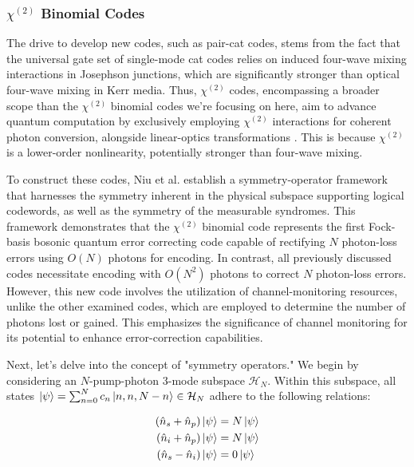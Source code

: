 \documentclass[11pt]{article}
\newcommand\0{\mathbf{0}}
\newcommand\<{\langle}
\renewcommand\>{\rangle}
\begin{document}
\subsubsection{$\chi^{(2)}$ Binomial Codes}
\label{sec:multi-binom}

The drive to develop new codes, such as pair-cat codes, stems from the fact that the universal gate set of single-mode cat codes relies on induced four-wave mixing interactions in Josephson junctions, which are significantly stronger than optical four-wave mixing in Kerr media. Thus, $\chi^{(2)}$ codes, encompassing a broader scope than the $\chi^{(2)}$ binomial codes we're focusing on here, aim to advance quantum computation by exclusively employing $\chi^{(2)}$ interactions for coherent photon conversion, alongside linear-optics transformations \cite{niu2018hardware}. This is because $\chi^{(2)}$ is a lower-order nonlinearity, potentially stronger than four-wave mixing.

To construct these codes, Niu et al. establish a symmetry-operator framework that harnesses the symmetry inherent in the physical subspace supporting logical codewords, as well as the symmetry of the measurable syndromes. This framework demonstrates that the $\chi^{(2)}$ binomial code represents the first Fock-basis bosonic quantum error correcting code capable of rectifying $N$ photon-loss errors using $O(N)$ photons for encoding. In contrast, all previously discussed codes necessitate encoding with $O(N^2)$ photons to correct $N$ photon-loss errors. However, this new code involves the utilization of channel-monitoring resources, unlike the other examined codes, which are employed to determine the number of photons lost or gained. This emphasizes the significance of channel monitoring for its potential to enhance error-correction capabilities.

Next, let's delve into the concept of "symmetry operators." We begin by considering an $N$-pump-photon 3-mode subspace $\mathcal{H}_N$. Within this subspace, all states $\ket{\psi} = \sum_{n=0}^N c_n \ket{n, n, N-n} \in \mathcal{H}_N$ adhere to the following relations:

\begin{align}
\begin{split}
	(\hat{n}_s + \hat{n}_p) \ket{\psi} &= N\ket{\psi} \\
	(\hat{n}_i + \hat{n}_p) \ket{\psi} &= N\ket{\psi} \\
	(\hat{n}_s - \hat{n}_i) \ket{\psi} &= 0\ket{\psi}
\end{split}
\end{align}
\end{document}

